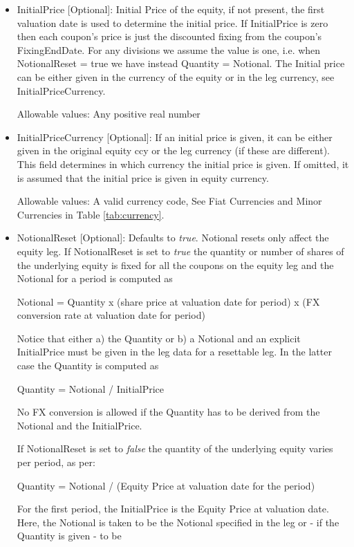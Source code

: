 \begin{itemize}
\item InitialPrice [Optional]: Initial Price of the equity, if not present, the first valuation date is used to
  determine the initial price. If InitialPrice is zero then each coupon's price is just the discounted fixing from the coupon's FixingEndDate. For any divisions we assume the value is one, i.e. when NotionalReset = true we have instead Quantity = Notional. The Initial price can be either given in the currency of the equity or in the leg
  currency, see InitialPriceCurrency.

Allowable values: Any positive real number

\item InitialPriceCurrency [Optional]: If an initial price is given, it can be either given in the original equity ccy
  or the leg currency (if these are different). This field determines in which currency the initial price is given. If
  omitted, it is assumed that the initial price is given in equity currency.

Allowable values: A valid currency code, See Fiat Currencies and Minor Currencies in Table \ref{tab:currency}.

\item NotionalReset [Optional]: Defaults to \emph{true}.  Notional resets only affect the equity leg. If NotionalReset
  is set to \emph{true} the quantity or number of shares of the underlying equity is fixed for all the coupons on the
  equity leg and the Notional for a period is computed as

  Notional = Quantity x (share price at valuation date for period) x (FX conversion rate at valuation date for period)

  Notice that either a) the Quantity or b) a Notional and an explicit InitialPrice must be given in the leg data for a
  resettable leg. In the latter case the Quantity is computed as

  Quantity = Notional / InitialPrice

  No FX conversion is allowed if the Quantity has to be derived from the Notional and the InitialPrice.

  If NotionalReset is set to \emph{false} the quantity of the underlying equity varies per period, as per:
  
  Quantity = Notional / (Equity Price at valuation date for the period)

For the first period, the InitialPrice is the Equity Price at valuation date.
Here, the Notional is taken to be the Notional specified in the leg or - if the Quantity is given - to be


\end{itemize}
